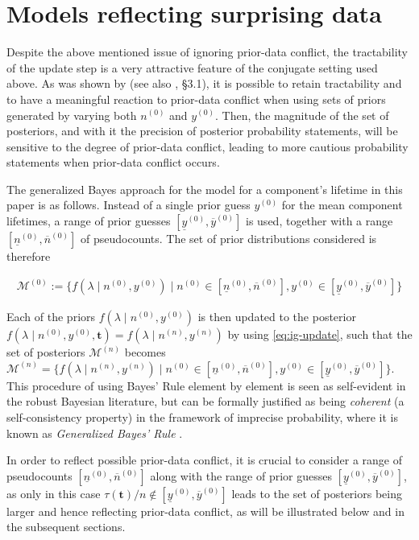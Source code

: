 \documentclass[Journal,letterpaper]{ascelike-new}
\renewcommand{\vec}[1]{{\bm#1}}
\newcommand{\uz}{^{(0)}} %
\newcommand{\un}{^{(n)}} %
\newcommand{\ul}[1]{\underline{#1}}
\newcommand{\ol}[1]{\overline{#1}}
\def\yz{y\uz}
\def\yn{y\un}
\def\yzl{\ul{y}\uz}
\def\yzu{\ol{y}\uz}
\def\nz{n\uz}
\def\nn{n\un}
\def\nzl{\ul{n}\uz}
\def\nzu{\ol{n}\uz}
\def\taut{\tau(\vec{t})}
\def\MZ{\mathcal{M}\uz}
\def\MN{\mathcal{M}\un}
\begin{document}
\section{Models reflecting surprising data}
\label{sec:modforsurpr}

Despite the above mentioned issue of ignoring prior-data conflict,
the tractability of the update step
is a very attractive feature of the conjugate setting used above.
As was shown by  (see also , \S 3.1),
it is possible to retain tractability and to have a meaningful reaction to prior-data conflict
when using sets of priors generated by varying both $\nz$ and $\yz$.
Then, the magnitude of the set of posteriors,
and with it the precision of posterior probability statements,
will be sensitive to the degree of prior-data conflict,
leading to more cautious probability statements when prior-data conflict occurs.

The generalized Bayes approach for the model for a component's lifetime in this
paper is as follows. Instead of a single prior guess $\yz$ for the mean component 
lifetimes, a range of prior guesses $[\yzl, \yzu]$ is used, together with a range $[\nzl, \nzu]$ of pseudocounts.
The set of prior distributions considered is therefore
\begin{linenomath*}
\begin{align}
\MZ := \{ f(\lambda\mid\nz,\yz) \mid \nz \in [\nzl, \nzu], \yz \in [\yzl, \yzu] \}
\label{eq:setofpriors}
\end{align}
\end{linenomath*}
Each of the priors $f(\lambda\mid\nz,\yz)$ is then updated to the posterior
$f(\lambda\mid\nz,\yz,\vec{t}) = f(\lambda\mid\nn,\yn)$
by using \eqref{eq:ig-update},
such that the set of posteriors $\MN$ becomes
$\MN = \{ f(\lambda\mid\nn,\yn) \mid \nz \in [\nzl, \nzu], \yz \in [\yzl, \yzu] \}$.
This procedure of using Bayes' Rule element by element
is seen as self-evident in the robust Bayesian literature,
but can be formally justified as being \emph{coherent}
(a self-consistency property)
in the framework of imprecise probability, where it is known as
\emph{Generalized Bayes' Rule} \cite[\S 6.4]{1991:walley}.

In order to reflect possible prior-data conflict, it is crucial to consider a range of pseudocounts $[\nzl, \nzu]$
along with the range of prior guesses $[\yzl, \yzu]$, as only in this case $\taut/n \not\in [\yzl, \yzu]$
leads to the set of posteriors being larger and hence reflecting prior-data conflict, as will be illustrated below and
in the subsequent sections.
\end{document}
